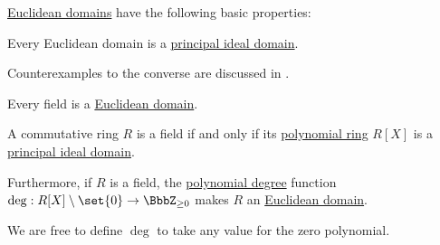 \begin{proposition}\label{thm:def:euclidean_domain}
  \hyperref[def:euclidean_domain]{Euclidean domains} have the following basic properties:
  \begin{thmenum}
     Every Euclidean domain is a \hyperref[def:principal_ideal_domain]{principal ideal domain}.

    Counterexamples to the converse are discussed in \cite{Anderson1988}.

     Every field is a \hyperref[def:euclidean_domain]{Euclidean domain}.

     A commutative ring \( R \) is a field if and only if its \hyperref[def:polynomial_algebra]{polynomial ring} \( R[X] \) is a \hyperref[def:principal_ideal_domain]{principal ideal domain}.

    Furthermore, if \( R \) is a field, the \hyperref[def:polynomial_degree]{polynomial degree} function \( \deg: R[X] \setminus \set{ 0 } \to \BbbZ_{\geq 0} \) makes \( R \) an \hyperref[def:euclidean_domain]{Euclidean domain}.

    We are free to define \( \deg \) to take any value for the zero polynomial.
  \end{thmenum}
\end{proposition}
